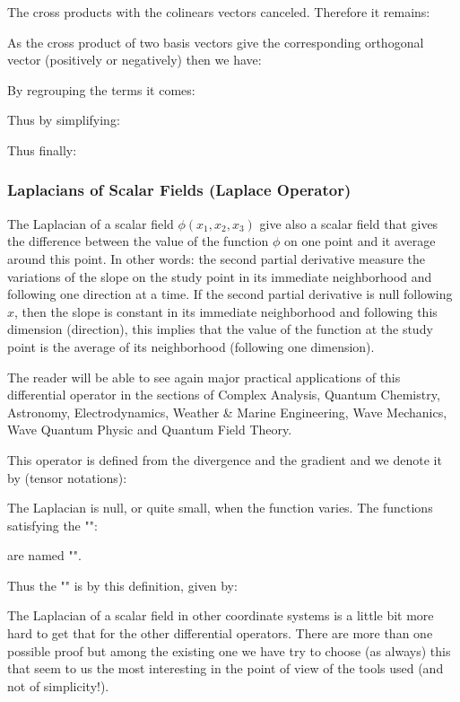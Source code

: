 	The cross products with the colinears vectors canceled. Therefore it remains:
	
	As the cross product of two basis vectors give the corresponding orthogonal vector (positively or negatively) then we have:
	
	By regrouping the terms it comes:
	
	Thus by simplifying:
	
	Thus finally:
	
	
	\pagebreak
	\subsubsection{Laplacians of Scalar Fields (Laplace Operator)}\label{scalar laplacian}
	The Laplacian of a scalar field $\phi(x_1,x_2,x_3)$ give also a scalar field that gives the difference between the value of the function $\phi$ on one point and it average around this point. In other words: the second partial derivative measure the variations of the slope on the study point in its immediate neighborhood and following one direction at a time. If the second partial derivative is null following $x$, then the slope is constant in its immediate neighborhood and following this dimension (direction), this implies that the value of the function at the study point is the average of its neighborhood (following one dimension).
	
	The reader will be able to see again major practical applications of this differential operator in the sections of Complex Analysis, Quantum Chemistry, Astronomy, Electrodynamics, Weather \& Marine Engineering, Wave Mechanics, Wave Quantum Physic and Quantum Field Theory.
	
	This operator is defined from the divergence and the gradient and we denote it by (tensor notations):
	
	The Laplacian is null, or quite small, when the function varies. The functions satisfying the "":
	
	are named "".
	
	Thus the "" is by this definition, given by:
	
	The Laplacian of a scalar field in other coordinate systems is a little bit more hard to get that for the other differential operators. There are more than one possible proof but among the existing one we have try to choose (as always) this that seem to us the most interesting in the point of view of the tools used (and not of simplicity!).

